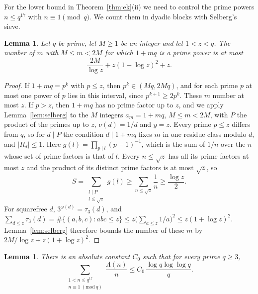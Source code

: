 \documentclass[12pt]{amsart}
\numberwithin{equation}{section}
\newtheorem{lemma}[theorem]{Lemma}
\theoremstyle{definition}
\begin{document}
For the lower bound in Theorem~\ref{thm:ek}(ii) we need to control the prime powers $n\le q^{17}$
with $n\equiv1\pmod q$. We count them in dyadic blocks with Selberg's sieve.

\begin{lemma}\label{lem:block}
Let $q$ be prime, let $M\ge1$ be an integer and let $1<z<q$. The number of $m$ with
$M\le m<2M$ for which $1+mq$ is a prime power is at most
\[
  \frac{2M}{\log z}+z(1+\log z)^2+z.
\]
\end{lemma}

\begin{proof}
If $1+mq=p^k$ with $p\le z$, then $p^k\in(Mq,2Mq)$, and for each prime $p$ at most one power of
$p$ lies in this interval, since $p^{k+1}\ge2p^k$. These $m$ number at most $z$. If $p>z$, then
$1+mq$ has no prime factor up to $z$, and we apply Lemma~\ref{lem:selberg} to the $M$ integers
$a_m=1+mq$, $M\le m<2M$, with $P$ the product of the primes up to $z$, $\nu(d)=1/d$ and $y=z$.
Every prime $p\le z$ differs from $q$, so for $d\mid P$ the condition $d\mid1+mq$ fixes $m$ in one
residue class modulo $d$, and $|R_d|\le1$. Here $g(l)=\prod_{p\mid l}(p-1)^{-1}$, which is the sum
of $1/n$ over the $n$ whose set of prime factors is that of $l$. Every $n\le\sqrt z$ has all its
prime factors at most $z$ and the product of its distinct prime factors is at most $\sqrt z$, so
\[
  S=\sum_{\substack{l\mid P\\l\le\sqrt z}}g(l)\ge\sum_{n\le\sqrt z}\frac1n\ge\frac{\log z}2.
\]
For squarefree $d$, $3^{\omega(d)}=\tau_3(d)$, and
$\sum_{d\le z}\tau_3(d)=\#\{(a,b,c):abc\le z\}\le z\bigl(\sum_{a\le z}1/a\bigr)^2\le z(1+\log z)^2$.
Lemma~\ref{lem:selberg} therefore bounds the number of these $m$ by $2M/\log z+z(1+\log z)^2$.
\end{proof}

\begin{lemma}\label{lem:progression}
There is an absolute constant $C_0$ such that for every prime $q\ge3$,
\[
  \sum_{\substack{1<n\le q^{17}\\n\equiv1\ (\mathrm{mod}\ q)}}\frac{\Lambda(n)}n
  \le C_0\,\frac{\log q\log\log q}q.
\]
\end{lemma}
\end{document}
